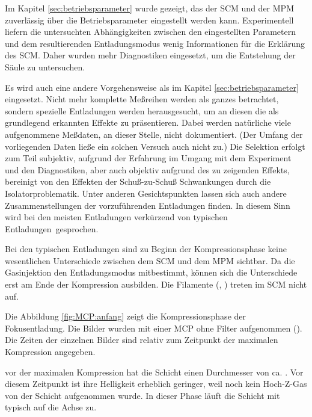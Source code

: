 %
%
\label{sec:untersuchung}
%
Im Kapitel \ref{sec:betriebsparameter} wurde gezeigt, das der SCM und
der MPM zuverlässig über die Betriebsparameter eingestellt werden kann.
Experimentell liefern die untersuchten Abhängigkeiten zwischen den
eingestellten Parametern und dem resultierenden Entladungsmodus wenig
Informationen für die Erklärung des SCM. Daher wurden mehr Diagnostiken
eingesetzt, um die Entstehung der Säule zu untersuchen.
\par
Es wird auch eine andere Vorgehensweise als im Kapitel
\ref{sec:betriebsparameter} eingesetzt. Nicht mehr komplette Meßreihen
werden als ganzes betrachtet, sondern spezielle Entladungen werden
herausgesucht, um an diesen die als grundlegend erkannten Effekte zu
präsentieren. Dabei werden natürliche viele aufgenommene Meßdaten, an
dieser Stelle, nicht dokumentiert. (Der Umfang der vorliegenden Daten
ließe ein solchen Versuch auch nicht zu.) Die Selektion erfolgt zum
Teil subjektiv, aufgrund der Erfahrung im Umgang mit dem Experiment und
den Diagnostiken, aber auch objektiv aufgrund des zu zeigenden Effekts,
bereinigt von den Effekten der Schuß-zu-Schuß Schwankungen durch die
Isolatorproblematik. Unter anderen Gesichtspunkten lassen sich auch
andere Zusammenstellungen der vorzuführenden Entladungen finden. In
diesem Sinn wird bei den meisten Entladungen verkürzend von \glqq
typischen Entladungen\grqq\ gesprochen.
%
%
\par
Bei den typischen Entladungen sind zu Beginn der Kompressionsphase
keine wesentlichen Unterschiede zwischen dem SCM und dem MPM
sichtbar. Da die Gasinjektion den Entladungsmodus mitbestimmt,
können sich die Unterschiede erst am Ende der Kompression
ausbilden. Die Filamente (, ) treten im
SCM nicht auf.
\par
Die Abbildung \vref{fig:MCP:anfang} zeigt die Kompressionsphase
der Fokusentladung. Die Bilder wurden mit einer MCP ohne Filter
aufgenommen (). Die Zeiten der einzelnen
Bilder sind relativ zum Zeitpunkt der maximalen Kompression
angegeben.
\par
{} vor der maximalen Kompression hat die Schicht einen
Durchmesser von ca. . Vor diesem Zeitpunkt ist ihre
Helligkeit erheblich geringer, weil noch kein Hoch-Z-Gas von der
Schicht aufgenommen wurde. In dieser Phase läuft die Schicht mit
typisch  auf die Achse zu.
%
\par
